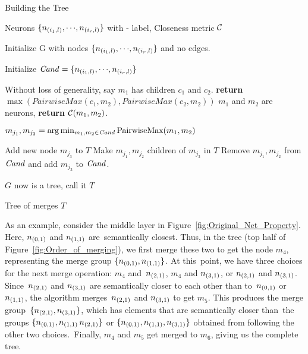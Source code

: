 \begin{algorithm}
\caption{Building the Tree}
\label{a:build-tree}
\begin{algorithmic}[1]

    \Require Neurons $\{n_{(i_1,l)}, {\cdots}, n_{(i_r,l)}\}$ with \inc-\dec
    label, Closeness metric $\mathcal{C}$

    
    \State Initialize G with nodes $\{ n_{(i_1,l)}, {\cdots}, n_{(i_r,l)} \}$
    and no edges. \label{a:build-tree:init}

    \State Initialize $\mathit{Cand}=\{ n_{(i_1,l)}, {\cdots}, n_{(i_r,l)} \}$
    \label{a:build-tree:init-cand}

     \label{a:build-tree:fn-start}
        
            \State Without loss of generality, say $m_1$ has children $c_1$ and
            $c_2$. 
            \State \textbf{return} $\max( PairwiseMax( c_1, m_2 ), PairwiseMax(
            c_2, m_2 ) )$
        \Else
            \State $m_1$ and $m_2$ are neurons, \textbf{return} $\mathcal{C}( m_1, m_2 )$.
        \EndIf

    \EndFunction \label{a:build-tree:fn-end}

     \label{a:build-tree:loop}
    
        \State $m_{j_1}, m_{j_2} = \arg\min_{\substack{m_1, m_2 \in \mathit{Cand}}} 
            \text{PairwiseMax}(m_1, m_2)$ \label{a:build-tree:get-mij}

        \State Add new node $m_{j_3}$ to $T$ \label{a:build-tree:merge-start}
        \State Make $m_{j_1}, m_{j_2}$ children of $m_{j_3}$ in $T$
        \State Remove $m_{j_1}, m_{j_2}$ from $\mathit{Cand}$ and add $m_{j_3}$ to
        $\mathit{Cand}$.
            \label{a:build-tree:merge-end}
    \EndWhile

    \State $G$ now is a tree, call it $T$

    \Ensure Tree of merges $T$
\end{algorithmic}
\end{algorithm}

As an example, consider the middle layer in Figure \ref{fig:Original_Net_Property}. Here, $n_{(0,1)}$ and $n_{(1,1)}$ are semantically closest. Thus, in the tree (top half of Figure \ref{fig:Order_of_merging}), we first merge these two to get the node $m_4$, representing the merge group $\{n_{(0,1)}, n_{(1,1)}\}$. At this point, we have three choices for the next merge operation: $m_4$ and $n_{(2,1)}$, $m_4$ and $n_{(3,1)}$, or $n_{(2,1)}$ and $n_{(3,1)}$. Since $n_{(2,1)}$ and $n_{(3,1)}$ are semantically closer to each other than to $n_{(0,1)}$ or $n_{(1,1)}$, the algorithm merges $n_{(2,1)}$ and $n_{(3,1)}$ to get $m_5$. This produces the merge group $\{n_{(2,1)}, n_{(3,1)}\}$, which has elements that are semantically closer than the groups $\{n_{(0,1)}, n_{(1,1)}\, n_{(2,1)}\}$ or $\{n_{(0,1)}, n_{(1,1)},
n_{(3,1)} \}$ obtained from following the other two choices. Finally, $m_4$ and $m_5$ get merged to $m_6$, giving us the complete tree.
 
